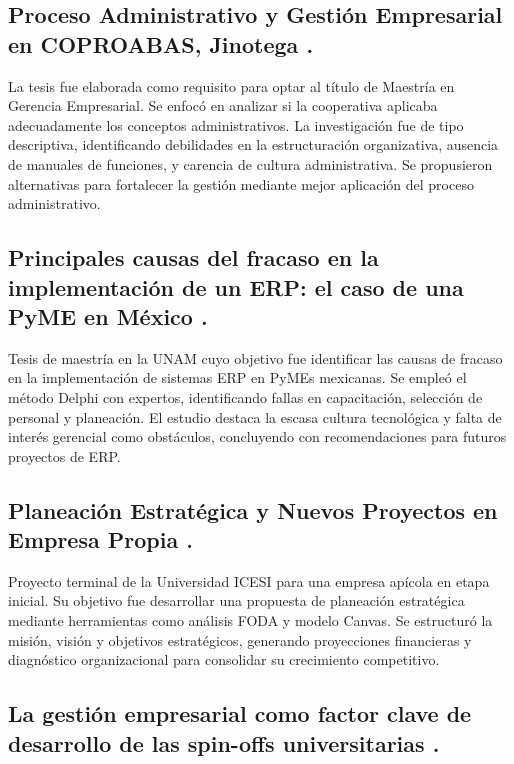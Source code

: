 \subsection{Proceso Administrativo y Gestión Empresarial en COPROABAS, Jinotega \cite{Flores15}.}

La tesis fue elaborada como requisito para optar al título de Maestría en Gerencia Empresarial. Se enfocó en analizar si la cooperativa aplicaba adecuadamente los conceptos administrativos. La investigación fue de tipo descriptiva, identificando debilidades en la estructuración organizativa, ausencia de manuales de funciones, y carencia de cultura administrativa. Se propusieron alternativas para fortalecer la gestión mediante mejor aplicación del proceso administrativo.

\subsection{Principales causas del fracaso en la implementación de un ERP: el caso de una PyME en México \cite{Delgado2015}.}

Tesis de maestría en la UNAM cuyo objetivo fue identificar las causas de fracaso en la implementación de sistemas ERP en PyMEs mexicanas. Se empleó el método Delphi con expertos, identificando fallas en capacitación, selección de personal y planeación. El estudio destaca la escasa cultura tecnológica y falta de interés gerencial como obstáculos, concluyendo con recomendaciones para futuros proyectos de ERP.

\subsection{Planeación Estratégica y Nuevos Proyectos en Empresa Propia \cite{Patino19}.}

Proyecto terminal de la Universidad ICESI para una empresa apícola en etapa inicial. Su objetivo fue desarrollar una propuesta de planeación estratégica mediante herramientas como análisis FODA y modelo Canvas. Se estructuró la misión, visión y objetivos estratégicos, generando proyecciones financieras y diagnóstico organizacional para consolidar su crecimiento competitivo.

\subsection{La gestión empresarial como factor clave de desarrollo de las spin-offs universitarias \cite{Rodeiro2012}.}

